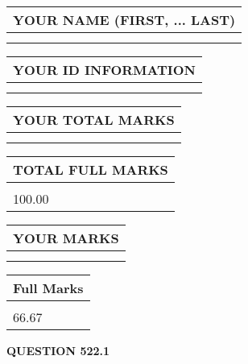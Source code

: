 \documentclass{ctexart}
\begin{document}
   
   
   
\newpage 
\setcounter{page}{ 
   522001 } 
   
   
   
   
\noindent\begin{tabular}{|l|}
\hline
YOUR NAME (FIRST, ... LAST)  \\
\hline
 \\ 
 \\ 
\hline
\end{tabular}
\hspace{0.05in} \begin{tabular}{|l|}
\hline
 YOUR   ID   INFORMATION  \\
\hline
 \\ 
 \\ 
\hline
\end{tabular}
   
   
\vspace{0.2in}\noindent\begin{tabular}{|l|}
\hline
YOUR TOTAL MARKS  \\
\hline
 \\ 
 \\ 
\hline
\end{tabular}
\hspace{0.05in} \begin{tabular}{|l|}
\hline
TOTAL FULL MARKS  \\
\hline
 \\ 
100.00 \\
\hline
\end{tabular}
   
   
 \vspace{0.2in}
 
 
 
 
   
   
  
\vspace{0.2in}
  
\noindent\begin{tabular}{|l|}
\hline
 YOUR MARKS  \\
\hline
 \\ 
 \\ 
\hline
\end{tabular}
\hspace{0.05in} \begin{tabular}{|l|}
\hline
 Full Marks  \\
\hline
 \\ 
66.67 \\
\hline
\end{tabular}
{\textbf{\Large{QUESTION
522.1 
}}}
  
\end{document}
